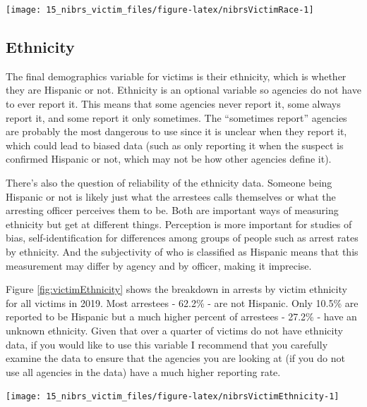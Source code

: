 \documentclass[
]{krantz}
\let\origfigure\figure
\let\endorigfigure\endfigure
\renewenvironment{figure}[1][2] {
    \expandafter\origfigure\expandafter[H]
} {
    \endorigfigure
}
\begin{document}
\begin{figure}

{\centering \texttt{[image: 15\_nibrs\_victim\_files/figure-latex/nibrsVictimRace-1]} 

}

\caption{The share of victims by race, 1991-2022.}\label{fig:nibrsVictimRace}
\end{figure}

\subsection{Ethnicity}\label{ethnicity-3}

The final demographics variable for victims is their
ethnicity, which is whether they are Hispanic or not.
Ethnicity is an optional variable so agencies do not have to
ever report it. This means that some agencies never report
it, some always report it, and some report it only
sometimes. The ``sometimes report'' agencies are probably
the most dangerous to use since it is unclear when they
report it, which could lead to biased data (such as only
reporting it when the suspect is confirmed Hispanic or not,
which may not be how other agencies define it).

There's also the question of reliability of the ethnicity
data. Someone being Hispanic or not is likely just what the
arrestees calls themselves or what the arresting officer
perceives them to be. Both are important ways of measuring
ethnicity but get at different things. Perception is more
important for studies of bias, self-identification for
differences among groups of people such as arrest rates by
ethnicity. And the subjectivity of who is classified as
Hispanic means that this measurement may differ by agency
and by officer, making it imprecise.

Figure \ref{fig:victimEthnicity} shows the breakdown in
arrests by victim ethnicity for all victims in 2019. Most
arrestees - 62.2\% - are not Hispanic. Only 10.5\% are
reported to be Hispanic but a much higher percent of
arrestees - 27.2\% - have an unknown ethnicity. Given that
over a quarter of victims do not have ethnicity data, if you
would like to use this variable I recommend that you
carefully examine the data to ensure that the agencies you
are looking at (if you do not use all agencies in the data)
have a much higher reporting rate.

\begin{figure}

{\centering \texttt{[image: 15\_nibrs\_victim\_files/figure-latex/nibrsVictimEthnicity-1]} 

}

\caption{The share of victims by ethnicity, 1991-2022.}\label{fig:nibrsVictimEthnicity}
\end{figure}
\end{document}
